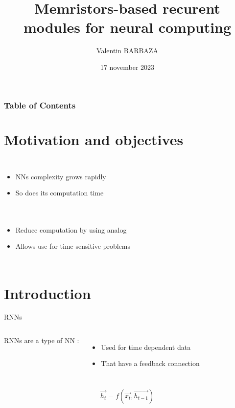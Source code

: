 \documentclass[14pt]{beamer}
\title{Memristors-based recurent modules for neural computing}
\subtitle{}
\author[V. BARBAZA]{{Valentin BARBAZA}}
\date{17 november 2023}
\begin{document}
\frame{\titlepage}

\begin{frame}
  \frametitle{Table of Contents}
  \tableofcontents
\end{frame}

\section{Motivation and objectives}

\begin{frame}{\insertsection}
  \begin{columns}
    \begin{itemize}
      \item NNs complexity grows rapidly
      \item So does its computation time
    \end{itemize}
    
  \end{columns}
\end{frame}

\begin{frame}{\insertsection}
  \begin{columns}
    \begin{itemize}
      \item Reduce computation by using analog
      \item Allows use for time sensitive problems
    \end{itemize}
    
  \end{columns}
\end{frame}

\section{Introduction}

\begin{frame}{\insertsection}{RNNs}
  \begin{columns}
    
    RNNs are a type of NN :
    \begin{itemize}
      \item Used for time dependent data
      \item That have a feedback connection
    \end{itemize}
  \end{columns}
  \vspace{0.8cm}

  \begin{equation}\label{eq:rnn}
    \overrightarrow{h_t}=f(\overrightarrow{x_t},\overrightarrow{h_{t-1}})
  \end{equation}
\end{frame}
\end{document}
